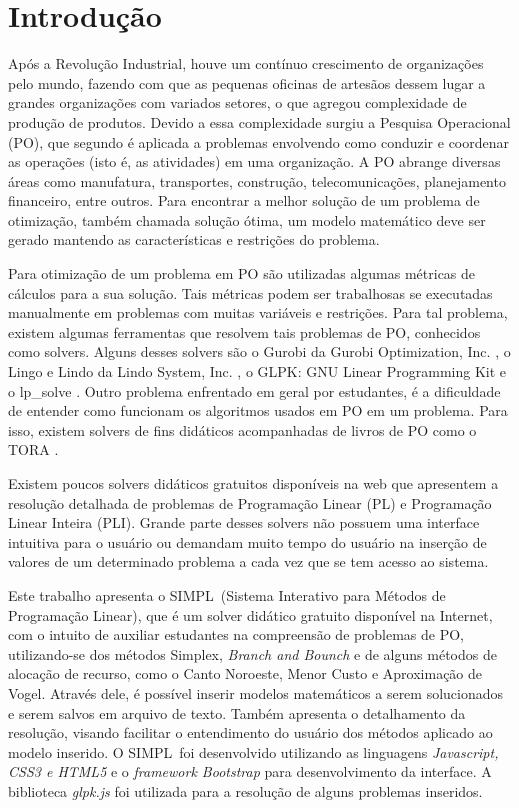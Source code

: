 \documentclass [11pt]{articleSBPO}
\newcommand{\sigla}[0] {SIMPL}
\newcommand{\nome}[0] {Sistema Interativo para Métodos de Programação Linear}
\begin{document}
\newpage

\section{Introdução}\label{sec:introducao}
Após a Revolução Industrial, houve um contínuo crescimento de organizações pelo mundo, fazendo com que as pequenas oficinas de artesãos dessem lugar a grandes organizações com variados setores, o que agregou complexidade de produção de produtos. Devido a essa complexidade surgiu a Pesquisa Operacional (PO), que segundo \cite{hillier} é aplicada a problemas envolvendo como conduzir e coordenar as operações (isto é, as atividades) em uma organização. A PO abrange diversas áreas como manufatura, transportes, construção, telecomunicações, planejamento financeiro, entre outros. Para encontrar a melhor solução de um problema de otimização, também chamada solução ótima, um modelo matemático deve ser gerado mantendo as características e restrições do problema.

Para otimização de um problema em PO são utilizadas algumas métricas de cálculos para a sua solução. Tais métricas podem ser trabalhosas se executadas manualmente em problemas com muitas variáveis e restrições. Para tal problema, existem algumas ferramentas que resolvem tais problemas de PO, conhecidos como solvers. Alguns desses solvers são o Gurobi da Gurobi Optimization, Inc. \cite{gurobi}, o Lingo e Lindo da Lindo System, Inc. \cite{lindo}, o GLPK: GNU Linear Programming Kit  \cite{glpk} e o lp\_solve \cite{lpsolve}. Outro problema enfrentado em geral por estudantes, é a dificuldade de entender como funcionam os algoritmos usados em PO em um problema. Para isso, existem solvers de fins didáticos acompanhadas de livros de PO como o TORA \cite{taha}. 

Existem poucos solvers didáticos gratuitos disponíveis na web que apresentem a resolução detalhada de problemas de Programação Linear (PL) e Programação Linear Inteira (PLI). Grande parte desses solvers não possuem uma interface intuitiva para o usuário ou demandam muito tempo do usuário na inserção de valores de um determinado problema a cada vez que se tem acesso ao sistema.

Este trabalho apresenta o \sigla\ (\nome), que é um solver didático gratuito disponível na Internet, com o intuito de auxiliar estudantes na compreensão de problemas de PO, utilizando-se dos métodos Simplex, \textit{Branch and Bounch} e de alguns métodos de alocação de recurso, como o Canto Noroeste, Menor Custo e Aproximação de Vogel. Através dele, é possível inserir modelos matemáticos a serem solucionados e serem salvos em arquivo de texto. Também apresenta o detalhamento da resolução, visando facilitar o entendimento do usuário dos métodos aplicado ao modelo inserido. O \sigla\ foi desenvolvido utilizando as linguagens \textit{Javascript, CSS3 e HTML5} e o \textit{framework Bootstrap} para desenvolvimento da interface. A biblioteca \textit{glpk.js} foi utilizada para a resolução de alguns problemas inseridos.
\end{document}
